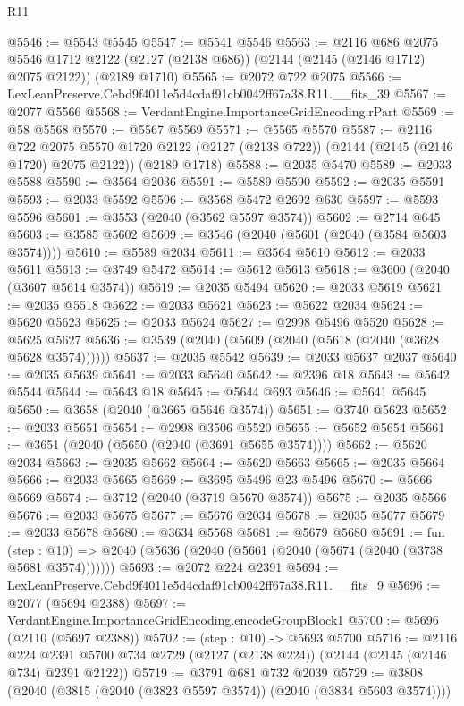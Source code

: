 \begin{lexlean}{R11}
\begin{coremodule}
@5546 := @5543 @5545
@5547 := @5541 @5546
@5563 := @2116
    @686
    @2075
    @5546
    @1712
    @2122
    (@2127 (@2138 @686))
    (@2144 (@2145 (@2146 @1712) @2075 @2122))
    (@2189 @1710)
@5565 := @2072 @722 @2075
@5566 := LexLeanPreserve.Cebd9f4011e5d4cdaf91cb0042ff67a38.R11.__fits_39
@5567 := @2077 @5566
@5568 := VerdantEngine.ImportanceGridEncoding.rPart
@5569 := @58 @5568
@5570 := @5567 @5569
@5571 := @5565 @5570
@5587 := @2116
    @722
    @2075
    @5570
    @1720
    @2122
    (@2127 (@2138 @722))
    (@2144 (@2145 (@2146 @1720) @2075 @2122))
    (@2189 @1718)
@5588 := @2035 @5470
@5589 := @2033 @5588
@5590 := @3564 @2036
@5591 := @5589 @5590
@5592 := @2035 @5591
@5593 := @2033 @5592
@5596 := @3568 @5472 @2692 @630
@5597 := @5593 @5596
@5601 := @3553 (@2040 (@3562 @5597 @3574))
@5602 := @2714 @645
@5603 := @3585 @5602
@5609 := @3546 (@2040 (@5601 (@2040 (@3584 @5603 @3574))))
@5610 := @5589 @2034
@5611 := @3564 @5610
@5612 := @2033 @5611
@5613 := @3749 @5472
@5614 := @5612 @5613
@5618 := @3600 (@2040 (@3607 @5614 @3574))
@5619 := @2035 @5494
@5620 := @2033 @5619
@5621 := @2035 @5518
@5622 := @2033 @5621
@5623 := @5622 @2034
@5624 := @5620 @5623
@5625 := @2033 @5624
@5627 := @2998 @5496 @5520
@5628 := @5625 @5627
@5636 := @3539 (@2040 (@5609 (@2040 (@5618 (@2040 (@3628 @5628 @3574))))))
@5637 := @2035 @5542
@5639 := @2033 @5637 @2037
@5640 := @2035 @5639
@5641 := @2033 @5640
@5642 := @2396 @18
@5643 := @5642 @5544
@5644 := @5643 @18
@5645 := @5644 @693
@5646 := @5641 @5645
@5650 := @3658 (@2040 (@3665 @5646 @3574))
@5651 := @3740 @5623
@5652 := @2033 @5651
@5654 := @2998 @3506 @5520
@5655 := @5652 @5654
@5661 := @3651 (@2040 (@5650 (@2040 (@3691 @5655 @3574))))
@5662 := @5620 @2034
@5663 := @2035 @5662
@5664 := @5620 @5663
@5665 := @2035 @5664
@5666 := @2033 @5665
@5669 := @3695 @5496 @23 @5496
@5670 := @5666 @5669
@5674 := @3712 (@2040 (@3719 @5670 @3574))
@5675 := @2035 @5566
@5676 := @2033 @5675
@5677 := @5676 @2034
@5678 := @2035 @5677
@5679 := @2033 @5678
@5680 := @3634 @5568
@5681 := @5679 @5680
@5691 := fun (step : @10) =>
  @2040 (@5636 (@2040 (@5661 (@2040 (@5674 (@2040 (@3738 @5681 @3574)))))))
@5693 := @2072 @224 @2391
@5694 := LexLeanPreserve.Cebd9f4011e5d4cdaf91cb0042ff67a38.R11.__fits_9
@5696 := @2077 (@5694 @2388)
@5697 := VerdantEngine.ImportanceGridEncoding.encodeGroupBlock1
@5700 := @5696 (@2110 (@5697 @2388))
@5702 := (step : @10) -> @5693 @5700
@5716 := @2116
    @224
    @2391
    @5700
    @734
    @2729
    (@2127 (@2138 @224))
    (@2144 (@2145 (@2146 @734) @2391 @2122))
@5719 := @3791 @681 @732 @2039
@5729 := @3808 (@2040 (@3815 (@2040 (@3823 @5597 @3574)) (@2040 (@3834 @5603 @3574))))

\end{coremodule}
\end{lexlean}
